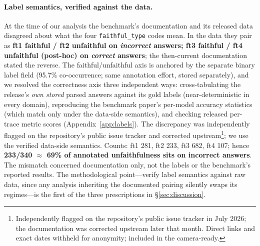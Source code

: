 \documentclass[11pt]{article}
\begin{document}
\paragraph{Label semantics, verified against the data.}
\label{sec:labels}
At the time of our analysis the benchmark's documentation and its released data disagreed about what the four \texttt{faithful\_type} codes mean. In the data they pair as \textbf{ft1 faithful / ft2 unfaithful on \emph{incorrect} answers; ft3 faithful / ft4 unfaithful (post-hoc) on \emph{correct} answers}; the then-current documentation stated the reverse. The faithful/unfaithful axis is anchored by the separate binary label field (95.7\% co-occurrence; same annotation effort, stored separately), and we resolved the correctness axis three independent ways: cross-tabulating the release's \emph{own stored} parsed answers against its gold labels (near-deterministic in every domain), reproducing the benchmark paper's per-model accuracy statistics (which match only under the data-side semantics), and checking released per-trace metric scores (Appendix~\ref{app:labels}). The discrepancy was independently flagged on the repository's public issue tracker and corrected upstream\footnote{Independently flagged on the repository's public issue tracker in July 2026; the documentation was corrected upstream later that month. Direct links and exact dates withheld for anonymity; included in the camera-ready.}; we use the verified data-side semantics. Counts: ft1 281, ft2 233, ft3 682, ft4 107; hence \textbf{233/340 $\approx$ 69\% of annotated unfaithfulness sits on incorrect answers}. The mismatch concerned documentation only, not the labels or the benchmark's reported results. The methodological point---verify label semantics against raw data, since any analysis inheriting the documented pairing silently swaps its regimes---is the first of the three prescriptions in \S\ref{sec:discussion}.
\end{document}
